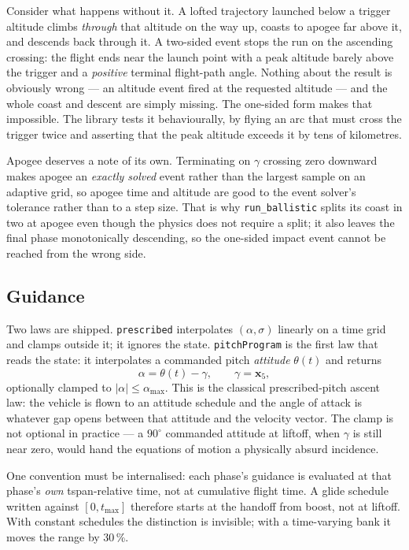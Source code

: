 \documentclass[11pt]{article}
\newcommand{\code}[1]{\texttt{#1}}
\begin{document}
Consider what happens without it. A lofted trajectory launched below a trigger
altitude climbs \emph{through} that altitude on the way up, coasts to apogee
far above it, and descends back through it. A two-sided event stops the run on
the ascending crossing: the flight ends near the launch point with a peak
altitude barely above the trigger and a \emph{positive} terminal flight-path
angle. Nothing about the result is obviously wrong --- an altitude event fired
at the requested altitude --- and the whole coast and descent are simply
missing. The one-sided form makes that impossible. The library tests it
behaviourally, by flying an arc that must cross the trigger twice and asserting
that the peak altitude exceeds it by tens of kilometres.

Apogee deserves a note of its own. Terminating on $\gamma$ crossing zero
downward makes apogee an \emph{exactly solved} event rather than the largest
sample on an adaptive grid, so apogee time and altitude are good to the event
solver's tolerance rather than to a step size. That is why
\code{run\_ballistic} splits its coast in two at apogee even though the physics
does not require a split; it also leaves the final phase monotonically
descending, so the one-sided impact event cannot be reached from the wrong
side.

\subsection{Guidance}

Two laws are shipped. \code{prescribed} interpolates $(\alpha,\sigma)$ linearly
on a time grid and clamps outside it; it ignores the state.
\code{pitchProgram} is the first law that reads the state: it interpolates a
commanded pitch \emph{attitude} $\theta(t)$ and returns
\begin{equation}
  \alpha = \theta(t) - \gamma, \qquad \gamma = \mathbf{x}_5 ,
  \label{eq:pitchprog}
\end{equation}
optionally clamped to $|\alpha|\le\alpha_{\max}$. This is the classical
prescribed-pitch ascent law: the vehicle is flown to an attitude schedule and
the angle of attack is whatever gap opens between that attitude and the
velocity vector. The clamp is not optional in practice --- a $90^{\circ}$
commanded attitude at liftoff, when $\gamma$ is still near zero, would hand the
equations of motion a physically absurd incidence.

One convention must be internalised: each phase's guidance is evaluated at that
phase's \emph{own} tspan-relative time, not at cumulative flight time. A glide
schedule written against $[0,t_{\max}]$ therefore starts at the handoff from
boost, not at liftoff. With constant schedules the distinction is invisible;
with a time-varying bank it moves the range by 30\,\%.
\end{document}
